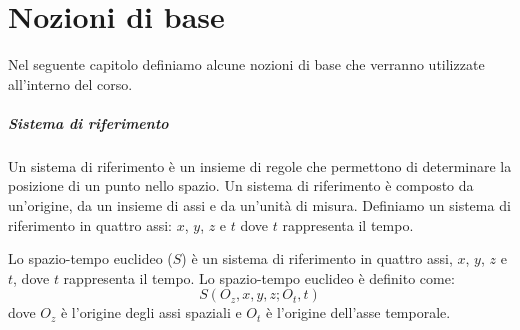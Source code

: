 \chapter{Nozioni di base}
Nel seguente capitolo definiamo alcune nozioni di base che verranno utilizzate all'interno del corso.

\paragraph{Sistema di riferimento} Un sistema di riferimento è un insieme di regole che permettono di determinare la posizione di un punto nello spazio. Un sistema di riferimento è composto da un'origine, da un insieme di assi e da un'unità di misura. Definiamo un sistema di riferimento in quattro assi: $x$, $y$, $z$ e $t$ dove $t$ rappresenta il tempo.
\begin{definition}
    Lo spazio-tempo euclideo ($S$) è un sistema di riferimento in quattro assi, $x$, $y$, $z$ e $t$, dove $t$ rappresenta il tempo. Lo spazio-tempo euclideo è definito come:
    $$
        S(O_z, x, y, z; O_t, t)
    $$
    dove $O_z$ è l'origine degli assi spaziali e $O_t$ è l'origine dell'asse temporale.
\end{definition}

